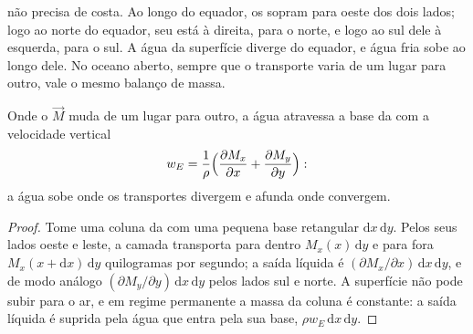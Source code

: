  não precisa de costa. Ao longo do equador, os  sopram para
oeste dos dois lados; logo ao norte do equador, seu  está à direita,
para o norte, e logo ao sul dele à esquerda, para o sul. A água da superfície diverge
do equador, e água fria sobe ao longo dele. No oceano aberto, sempre que o
transporte varia de um lugar para outro, vale o mesmo balanço de massa.

\begin{proposition}\label{prop:b1:ocean-circulation:pumping}
Onde o  $\vec M$ muda de um lugar para outro, a água atravessa a
base da  com a velocidade vertical
\[
  w_E = \frac{1}{\rho}\Bigl(\frac{\partial M_x}{\partial x} + \frac{\partial M_y}{\partial y}\Bigr):
\]
a água sobe onde os transportes divergem e afunda onde convergem.
\end{proposition}

\begin{proof}
Tome uma coluna da  com uma pequena base retangular $\mathrm dx\,\mathrm
dy$. Pelos seus lados oeste e leste, a camada transporta para dentro $M_x(x)\,\mathrm dy$
e para fora $M_x(x + \mathrm dx)\,\mathrm dy$ quilogramas por segundo; a saída líquida é
$(\partial M_x/\partial x)\,\mathrm dx\,\mathrm dy$, e de modo análogo
$(\partial M_y/\partial y)\,\mathrm dx\,\mathrm dy$ pelos lados sul e
norte. A superfície não pode subir para o ar, e em regime permanente a massa
da coluna é constante: a saída líquida é suprida pela água que entra pela
sua base, $\rho w_E\,\mathrm dx\,\mathrm dy$.
\end{proof}


